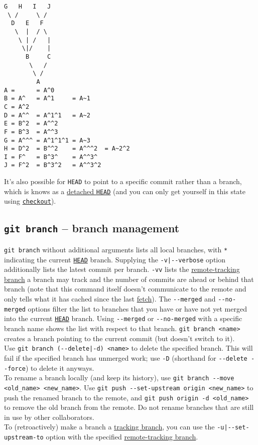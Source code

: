 \documentclass[8pt, table, xcdraw]{article}%
\begin{document}
\begin{lstlisting}
G   H   I   J
 \ /     \ /
  D   E   F
   \  |  / \
    \ | /   |
     \|/    |
      B     C
       \   /
        \ /
         A
A =      = A^0
B = A^   = A^1     = A~1
C = A^2
D = A^^  = A^1^1   = A~2
E = B^2  = A^^2
F = B^3  = A^^3
G = A^^^ = A^1^1^1 = A~3
H = D^2  = B^^2    = A^^^2  = A~2^2
I = F^   = B^3^    = A^^3^
J = F^2  = B^3^2   = A^^3^2
\end{lstlisting}

It's also possible for \lstinline{HEAD} to point to a specific commit rather than a branch, which is knows as a \hyperref[checkout]{detached \lstinline{HEAD}} (and you can only get yourself in this state using \hyperref[checkout]{\lstinline{checkout}}).

\subsection{\lstinline{git branch} -- branch management} \label{branch}

\lstinline{git branch} without additional arguments lists all local branches, with \lstinline{*} indicating the current \hyperref[branching]{\lstinline{HEAD}} branch. Supplying the \lstinline{-v|--verbose} option additionally lists the latest commit per branch. \lstinline{-vv} lists the \hyperref[remotes]{remote-tracking branch} a branch may track and the number of commits are ahead or behind that branch (note that this command itself doesn't communicate to the remote and only tells what it has cached since the last \hyperref[fetch]{fetch}). The \lstinline{--merged} and \lstinline{--no-merged} options filter the list to branches that you have or have not yet merged into the current \hyperref[branching]{\lstinline{HEAD}} branch. Using \lstinline{--merged} or \lstinline{--no-merged} with a specific branch name shows the list with respect to that branch.
\lstinline{git branch <name>} creates a branch pointing to the current commit (but doesn't switch to it).\\
Use \lstinline{git branch (--delete|-d) <name>} to delete the specified branch. This will fail if the specified branch has unmerged work; use \lstinline{-D} (shorthand for \lstinline{--delete --force}) to delete it anyways.\\
To rename a branch locally (and keep its history), use \lstinline{git branch --move <old_name> <new_name>}. Use \lstinline{git push --set-upstream origin <new_name>} to push the renamed branch to the remote, and \lstinline{git push origin -d <old_name>} to remove the old branch from the remote. Do not rename branches that are still in use by other collaborators.\\
To (retroactively) make a branch a \hyperref[remotes]{tracking branch}, you can use the \lstinline{-u|--set-upstream-to} option with the specified \hyperref[remotes]{remote-tracking branch}.
\end{document}
